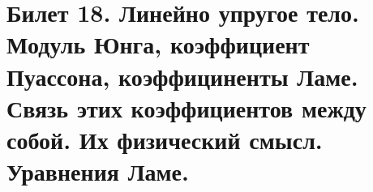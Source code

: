 \newpage
\section{Билет 18. Линейно упругое тело. Модуль Юнга, коэффициент Пуассона, коэффициненты Ламе. Связь этих коэффициентов между собой. Их физический смысл. Уравнения Ламе.}